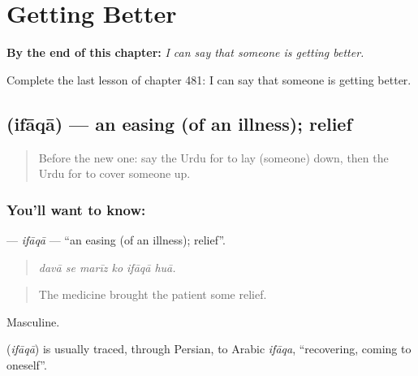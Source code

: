 
\chapter{Getting Better}
\label{ch:ur-getting-better}

\begin{chapteropening}
\textbf{By the end of this chapter:} \emph{I can say that someone is getting better.}

Complete the last lesson of chapter 481: I can say that someone is getting better.
\end{chapteropening}

\section[\texorpdfstring{\ur{افاقہ} (ifāqā)}{افاقہ (ifāqā)}]{ (ifāqā) — an easing (of an illness); relief}

\label{lesson:UR-C481-ifaqa}



\begin{quote}
Before the new one: say the Urdu for to lay (someone) down, then the Urdu for to cover someone up.
\end{quote}

\subsection*{You'll want to know: }
\textbf{} — \emph{ifāqā} — \textquotedblleft{}an easing (of an illness); relief\textquotedblright{}.

\begin{quote}
     
\end{quote}

\begin{quote}
\emph{davā se marīz ko ifāqā huā.}
\end{quote}

\begin{quote}
The medicine brought the patient some relief.
\end{quote}

Masculine.

\begin{cousinweb}
\textbf{} (\emph{ifāqā}) is usually traced, through Persian, to Arabic \emph{ifāqa}, \textquotedblleft{}recovering, coming to oneself\textquotedblright{}.
\end{cousinweb}

